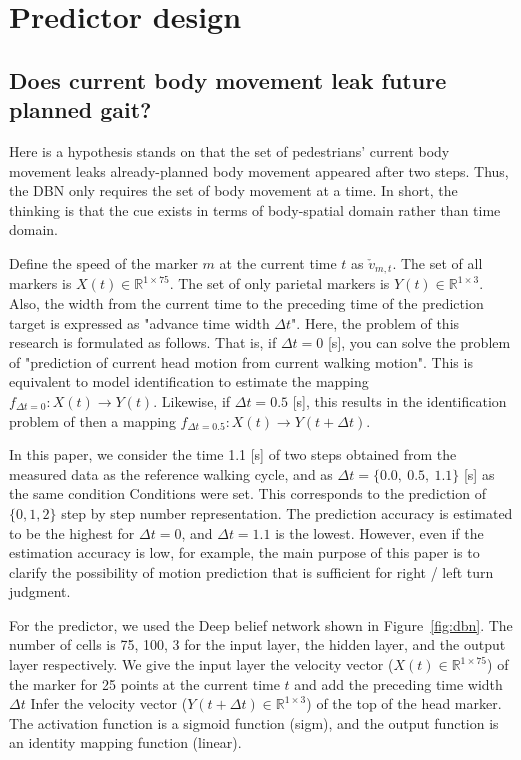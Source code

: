 \documentclass{sigchi}
\begin{document}
\section{Predictor design}

\subsection{Does current body movement leak future planned gait?}

Here is a hypothesis stands on that the set of pedestrians' current body movement leaks already-planned body movement appeared after two steps. Thus, the DBN only requires the set of body movement at a time. In short, the thinking is that the cue exists in terms of body-spatial domain rather than time domain. 

Define the speed of the marker $m$ at the current time $t$ as $\check{v}_{m, t}$. The set of all markers is $X(t)\in\mathbb{R}^{1 \times 75} $. The set of only parietal markers is $ Y(t)\in\mathbb {R}^{1\times 3}$. Also, the width from the current time to the preceding time of the prediction target is expressed as "advance time width $\Delta t$". Here, the problem of this research is formulated as follows. That is, if $\Delta t = 0$ [s], you can solve the problem of "prediction of current head motion from current walking motion". This is equivalent to model identification to estimate the mapping $ f_ {\Delta t = 0}: X (t) \rightarrow Y (t) $. Likewise, if $ \Delta t = 0.5 $ [s], this results in the identification problem of then a mapping $ f_ {\Delta t = 0.5}: X (t) \rightarrow Y (t + \Delta t) $.

In this paper, we consider the time 1.1 [s] of two steps obtained from the measured data as the reference walking cycle, and as $ \Delta t = \{0.0, \ 0.5, \ 1.1 \} $ [s] as the same condition Conditions were set. This corresponds to the prediction of $ \{0, 1, 2\} $ step by step number representation. The prediction accuracy is estimated to be the highest for $ \Delta t = 0 $, and $ \Delta t = 1.1 $ is the lowest. However, even if the estimation accuracy is low, for example, the main purpose of this paper is to clarify the possibility of motion prediction that is sufficient for right / left turn judgment.

For the predictor, we used the Deep belief network shown in Figure~\ref{fig:dbn}. The number of cells is 75, 100, 3 for the input layer, the hidden layer, and the output layer respectively. We give the input layer the velocity vector ($ X (t) \in \mathbb {R}^{1 \times 75} $) of the marker for 25 points at the current time $ t $ and add the preceding time width $ \Delta t $ Infer the velocity vector ($ Y (t + \Delta t) \in \mathbb {R} ^{1 \times 3} $) of the top of the head marker. The activation function is a sigmoid function (sigm), and the output function is an identity mapping function (linear).
\end{document}
